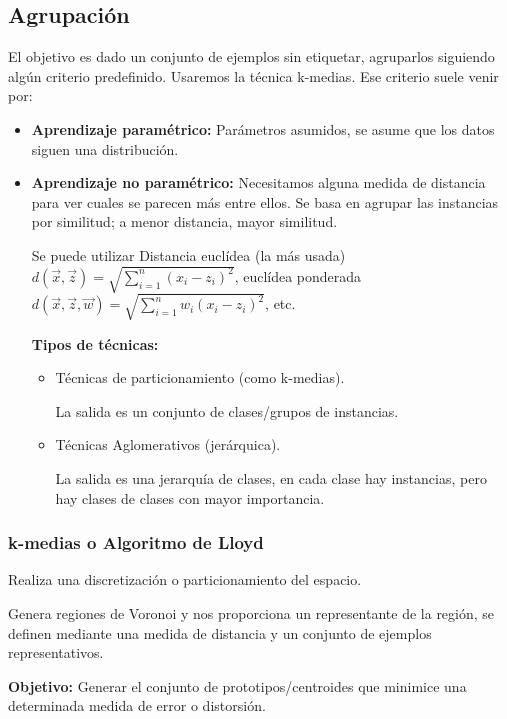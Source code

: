 \documentclass[12pt]{report} %
\begin{document}
\subsection{Agrupación}
El objetivo es dado un conjunto de ejemplos sin etiquetar, agruparlos siguiendo algún criterio predefinido. Usaremos la técnica k-medias.
Ese criterio suele venir por:
\begin{itemize}
  \item \textbf{Aprendizaje paramétrico:} Parámetros asumidos, se asume que los datos siguen una distribución.
  \item \textbf{Aprendizaje no paramétrico:} Necesitamos alguna medida de distancia para ver cuales se parecen más entre ellos. Se basa en agrupar las instancias por similitud; a menor distancia, mayor similitud. 

  Se puede utilizar Distancia euclídea (la más usada) $d\left( \vec{x},\vec{z}\right)   = \sqrt {\sum _{i=1}^{n}  \left( x_{i}-z_{i}\right)^2 }$, euclídea ponderada $d\left( \vec{x},\vec{z},\vec{w}\right)   = \sqrt {\sum _{i=1}^{n} w_i \left( x_{i}-z_{i}\right)^2 }$, etc.

  \textbf{Tipos de técnicas:}
  \begin{itemize}
    \item Técnicas de particionamiento (como k-medias).
    
    La salida es un conjunto de clases/grupos de instancias.

    \item Técnicas Aglomerativos (jerárquica).
    
    La salida es una jerarquía de clases, en cada clase hay instancias, pero hay clases de clases con mayor importancia.
  \end{itemize}
\end{itemize}

\subsubsection{k-medias o Algoritmo de Lloyd}

Realiza una discretización o particionamiento del espacio.

Genera regiones de Voronoi y nos proporciona un representante de la región, se definen mediante una medida de distancia y un conjunto de ejemplos representativos.

\textbf{Objetivo:} Generar el conjunto de prototipos/centroides que minimice una determinada medida de error o distorsión.
\end{document}
